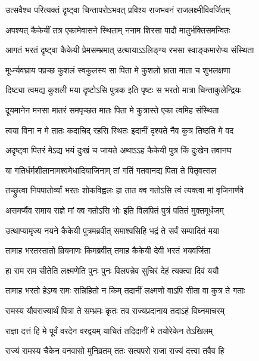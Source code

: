 \twolineshloka
{उत्सवैश्च परित्यक्तं दृष्ट्वा चिन्तापरोऽभवत्}
{प्रविश्य राजभवनं राजलक्ष्मीविवर्जितम्} %

\twolineshloka
{अपश्यत् कैकेयीं तत्र एकामेवासने स्थिताम्}
{ननाम शिरसा पादौ मातुर्भक्तिसमन्वितः} %

\twolineshloka
{आगतं भरतं दृष्ट्वा कैकेयी प्रेमसम्भ्रमात्}
{उत्थायाऽऽलिङ्ग्य रभसा स्वाङ्कमारोप्य संस्थिता} %

\twolineshloka
{मूर्ध्न्यवघ्राय पप्रच्छ कुशलं स्वकुलस्य सा}
{पिता मे कुशलो भ्राता माता च शुभलक्षणा} %

\twolineshloka
{दिष्ट्या त्वमद्य कुशली मया दृष्टोऽसि पुत्रक}
{इति पृष्टः स भरतो मात्रा चिन्ताकुलेन्द्रियः} %

\twolineshloka
{दूयमानेन मनसा मातरं समपृच्छत}
{मातः पिता मे कुत्रास्ते एका त्वमिह संस्थिता} %

\twolineshloka
{त्वया विना न मे तातः कदाचिद् रहसि स्थितः}
{इदानीं दृश्यते नैव कुत्र तिष्ठति मे वद} %

\twolineshloka
{अदृष्ट्वा पितरं मेऽद्य भयं दुःखं च जायते}
{अथाऽऽह कैकेयी पुत्र किं दुःखेन तवानघ} %

\twolineshloka
{या गतिर्धर्मशीलानामश्वमेधादियाजिनाम्}
{तां गतिं गतवानद्य पिता ते पितृवत्सल} %

\twolineshloka
{तच्छ्रुत्वा निपपातोर्व्यां भरतः शोकविह्वलः}
{हा तात क्व गतोऽसि त्वं त्यक्त्वा मां वृजिनार्णवे} %

\twolineshloka
{असमर्प्यैव रामाय राज्ञे मां क्व गतोऽसि भोः}
{इति विलपितं पुत्रं पतितं मुक्तमूर्धजम्} %

\twolineshloka
{उत्थाप्यामृज्य नयने कैकेयी पुत्रमब्रवीत्}
{समाश्वसिहि भद्रं ते सर्वं सम्पादितं मया} %

\twolineshloka
{तामाह भरतस्तातो म्रियमाणः किमब्रवीत्}
{तमाह कैकेयी देवी भरतं भयवर्जिता} %

\twolineshloka
{हा राम राम सीतेति लक्ष्मणेति पुनः पुनः}
{विलपन्नेव सुचिरं देहं त्यक्त्वा दिवं ययौ} %

\twolineshloka
{तामाह भरतो हेऽम्ब रामः सन्निहितो न किम्}
{तदानीं लक्ष्मणो वाऽपि सीता वा कुत्र ते गताः} %

\twolineshloka
{रामस्य यौवराज्यार्थं पित्रा ते सम्भ्रमः कृतः}
{तव राज्यप्रदानाय तदाऽहं विघ्नमाचरम्} %

\twolineshloka
{राज्ञा दत्तं हि मे पूर्वं वरदेन वरद्वयम्}
{याचितं तदिदानीं मे तयोरेकेन तेऽखिलम्} %

\twolineshloka
{राज्यं रामस्य चैकेन वनवासो मुनिव्रतम्}
{ततः सत्यपरो राजा राज्यं दत्त्वा तवैव हि} %

